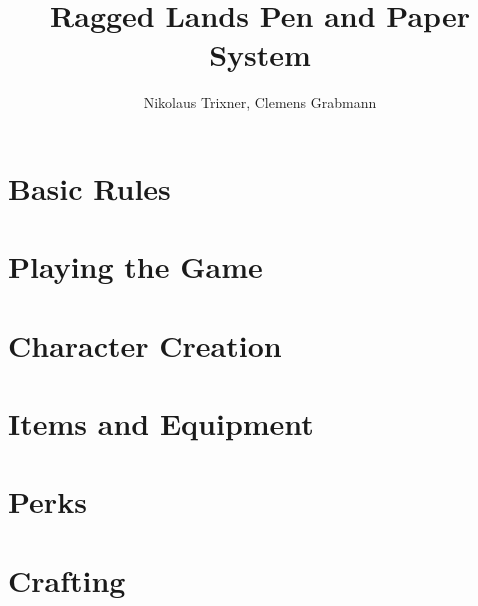 \documentclass[a4paper]{book}
\begin{document}
	\title{Ragged Lands Pen and Paper System}
	\author{Nikolaus Trixner, Clemens Grabmann}
		
	\maketitle
	
	\tableofcontents

%	
%	


\part{Basic Rules}\label{part:basicRules}
	
\part{Playing the Game}\label{part:playingTheGame}
	
	
	
	

\part{Character Creation}\label{part:characterCreation}
	
	
	
	
	
%	

\part{Items and Equipment}\label{part:itemsEquipment}
	
	

\part{Perks}\label{part:perks}
	
	
	
	
	
	
	

\part{Crafting}\label{part:crafting}
	

%	

\begin{appendices}
	
	
%	

\end{appendices}
\end{document}
